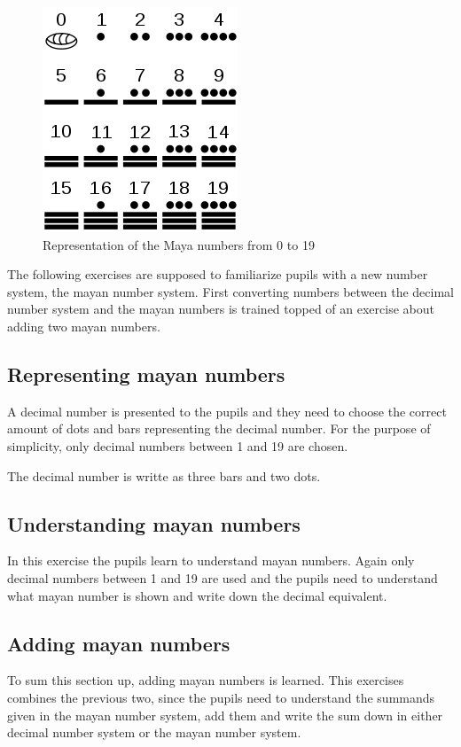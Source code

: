\begin{figure} 
    \centering
    \includegraphics[width=0.3 \columnwidth]{figures/maya_number_system.png}
    \caption{Representation of the Maya numbers from 0 to 19} 
    \label{fig:maya_numerals} 
\end{figure}

The following exercises are supposed to familiarize pupils with a new number system, the mayan number system. First converting numbers between the decimal number system and the mayan numbers is trained topped of an exercise about adding two mayan numbers.

\subsection*{Representing mayan numbers}

A decimal number is presented to the pupils and they need to choose the correct amount of dots and bars representing the decimal number. For the purpose of simplicity, only decimal numbers between 1 and 19 are chosen.

\begin{example}
    The decimal number  is writte as three bars and two dots.
\end{example}

\subsection*{Understanding mayan numbers}

In this exercise the pupils learn to understand mayan numbers. Again only decimal numbers between 1 and 19 are used and the pupils need to understand what mayan number is shown and write down the decimal equivalent.

\subsection*{Adding mayan numbers}

To sum this section up, adding mayan numbers is learned. This exercises combines the previous two, since the pupils need to understand the summands given in the mayan number system, add them and write the sum down in either decimal number system or the mayan number system.

